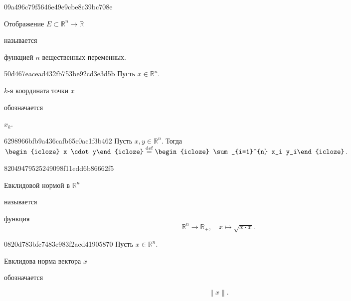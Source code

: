 \begin{note}{09a496c79f5646e49e9cbe8c39bc708e}
    \begin{icloze}{2}Отображение \({ E \subset \mathbb R^{n} \to \mathbb R }\)\end{icloze} называется \begin{icloze}{1}функцией \({ n }\) вещественных переменных.\end{icloze}
\end{note}

\begin{note}{50d467eacead432fb753be92cd3e3d5b}
    Пусть \({ x \in \mathbb R^{n} }\). \begin{icloze}{2}\({ k }\)-я координата точки \({ x }\)\end{icloze} обозначается \begin{icloze}{1}\({ x_k }\).\end{icloze}
\end{note}

\begin{note}{6298966bfb9a436cafb65c0ac1f3b462}
    Пусть \({ x, y \in \mathbb R^{n} }\).
    Тогда \({ \displaystyle \begin{icloze}{2}x \cdot y\end{icloze} \overset{\text{def}}= \begin{icloze}{1}\sum_{i=1}^{n} x_i y_i\end{icloze} }\).
\end{note}

\begin{note}{82049479525249098f11edd6b86662f5}
    \begin{icloze}{2}Евклидовой нормой в \({ \mathbb R^{n} }\)\end{icloze} называется \begin{icloze}{1}функция
    \[
        \mathbb R^{n} \to \mathbb R_+, \quad x \mapsto \sqrt{x \cdot x}.
    \]\end{icloze}
\end{note}

\begin{note}{0820d783bfc7483c983f2acd41905870}
    Пусть \({ x \in \mathbb R^{n} }\). \begin{icloze}{2}Евклидова норма вектора \({ x }\)\end{icloze} обозначается
    \begin{icloze}{1}
        \[
            \left\lVert x \right\rVert.
        \]
    \end{icloze}
\end{note}

